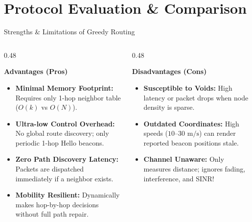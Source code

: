 \documentclass[aspectratio=169,10pt]{beamer}
\begin{document}
\section{Protocol Evaluation \& Comparison}

\begin{frame}{Strengths \& Limitations of Greedy Routing}
  \begin{columns}[T]
    \begin{column}{0.48\textwidth}
      \begin{exampleblock}{\textbf{Advantages (Pros)}}
        \begin{itemize}\setlength{\itemsep}{0.3em}
          \item \textbf{Minimal Memory Footprint:} Requires only 1-hop neighbor table ($O(k)$ vs $O(N)$).
          \item \textbf{Ultra-low Control Overhead:} No global route discovery; only periodic 1-hop Hello beacons.
          \item \textbf{Zero Path Discovery Latency:} Packets are dispatched immediately if a neighbor exists.
          \item \textbf{Mobility Resilient:} Dynamically makes hop-by-hop decisions without full path repair.
        \end{itemize}
      \end{exampleblock}
    \end{column}

    \begin{column}{0.48\textwidth}
      \begin{alertblock}{\textbf{Disadvantages (Cons)}}
        \begin{itemize}\setlength{\itemsep}{0.3em}
          \item \textbf{Susceptible to Voids:} High latency or packet drops when node density is sparse.
          \item \textbf{Outdated Coordinates:} High speeds ($10\text{--}30\text{ m/s}$) can render reported beacon positions stale.
          \item \textbf{Channel Unaware:} Only measures distance; ignores fading, interference, and SINR!
        \end{itemize}
      \end{alertblock}
    \end{column}
  \end{columns}
\end{frame}
\end{document}
